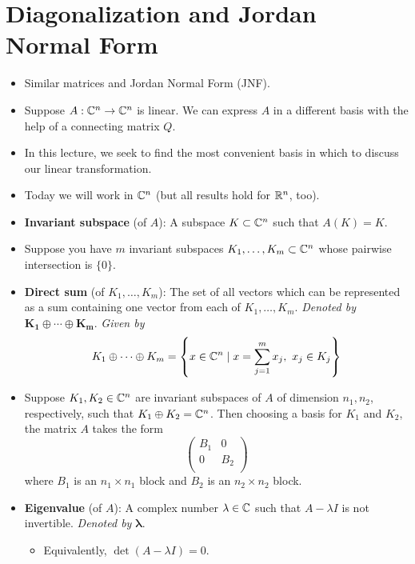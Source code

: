 \documentclass[../notes.tex]{subfiles}
\begin{document}
\section{Diagonalization and Jordan Normal Form}
\begin{itemize}
    \item {}Similar matrices and Jordan Normal Form (JNF).
    \item Suppose $A:\mathbb{C}^n\to\mathbb{C}^n$ is linear. We can express $A$ in a different basis with the help of a connecting matrix $Q$.
    \item In this lecture, we seek to find the most convenient basis in which to discuss our linear transformation.
    \item Today we will work in $\mathbb{C}^n$ (but all results hold for $\mathbb{R}^n$, too).
    \item \textbf{Invariant subspace} (of $A$): A subspace $K\subset\mathbb{C}^n$ such that $A(K)=K$.
    \item Suppose you have $m$ invariant subspaces $K_1,\dots,K_m\subset\mathbb{C}^n$ whose pairwise intersection is $\{0\}$.
    \item \textbf{Direct sum} (of $K_1,\dots,K_m$): The set of all vectors which can be represented as a sum containing one vector from each of $K_1,\dots,K_m$. \emph{Denoted by} $\bm{K_1\oplus\cdots\oplus K_m}$. \emph{Given by}
    \begin{equation*}
        K_1\oplus\cdots\oplus K_m = \left\{ x\in\mathbb{C}^n\mid x=\sum_{j=1}^mx_j,\ x_j\in K_j \right\}
    \end{equation*}
    \item Suppose $K_1,K_2\in\mathbb{C}^n$ are invariant subspaces of $A$ of dimension $n_1,n_2$, respectively, such that $K_1\oplus K_2=\mathbb{C}^n$. Then choosing a basis for $K_1$ and $K_2$, the matrix $A$ takes the form
    \begin{equation*}
        \begin{pmatrix}
            B_1 & 0\\
            0 & B_2\\
        \end{pmatrix}
    \end{equation*}
    where $B_1$ is an $n_1\times n_1$ block and $B_2$ is an $n_2\times n_2$ block.
    \item \textbf{Eigenvalue} (of $A$): A complex number $\lambda\in\mathbb{C}$ such that $A-\lambda I$ is not invertible. \emph{Denoted by} $\bm{\lambda}$.
    \begin{itemize}
        \item Equivalently, $\det(A-\lambda I)=0$.

\end{itemize}
\end{itemize}
\end{document}
